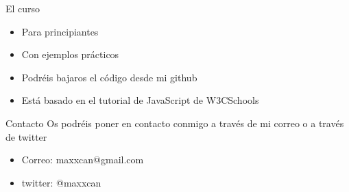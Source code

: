 \documentclass[presentation]{beamer}
\begin{document}
\begin{frame}[label={sec:org348d27c}]{El curso}
\begin{itemize}
\item Para principiantes
\end{itemize}
\pause
\begin{itemize}
\item Con ejemplos prácticos
\end{itemize}
\pause
\begin{itemize}
\item Podréis bajaros el código desde mi github
\end{itemize}
\pause
\begin{itemize}
\item Está basado en el tutorial de JavaScript de W3CSchools
\end{itemize}
\end{frame}
\begin{frame}[label={sec:orga3d6ed8}]{Contacto}
\alert{Os podréis poner en contacto conmigo a través de mi correo o a través de twitter}

\begin{itemize}
\item Correo: maxxcan@gmail.com
\item twitter: @maxxcan
\end{itemize}
\end{frame}
\end{document}
